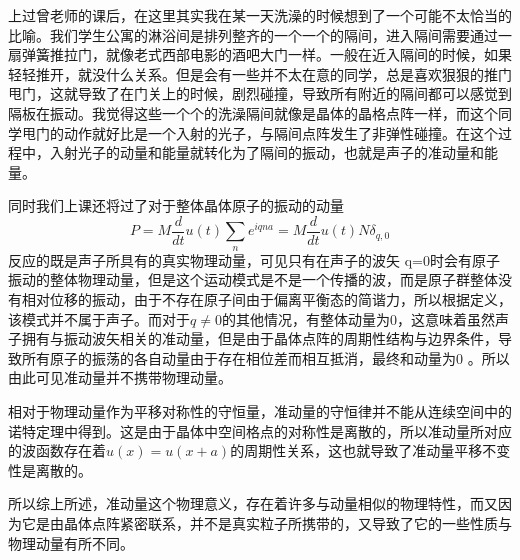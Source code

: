 \documentclass{article}
\begin{document}
上过曾老师的课后，在这里其实我在某一天洗澡的时候想到了一个可能不太恰当的比喻。我们学生公寓的淋浴间是排列整齐的一个一个的隔间，进入隔间需要通过一扇弹簧推拉门，就像老式西部电影的酒吧大门一样。一般在近入隔间的时候，如果轻轻推开，就没什么关系。但是会有一些并不太在意的同学，总是喜欢狠狠的推门甩门，这就导致了在门关上的时候，剧烈碰撞，导致所有附近的隔间都可以感觉到隔板在振动。我觉得这些一个个的洗澡隔间就像是晶体的晶格点阵一样，而这个同学甩门的动作就好比是一个入射的光子，与隔间点阵发生了非弹性碰撞。在这个过程中，入射光子的动量和能量就转化为了隔间的振动，也就是声子的准动量和能量。


同时我们上课还将过了对于整体晶体原子的振动的动量
\begin{equation}
	P=M\dfrac{d}{dt}u(t)\sum_{n}e^{iqna}=M\dfrac{d}{dt}u(t)N\delta_{q,0}
\end{equation}
反应的既是声子所具有的真实物理动量，可见只有在声子的波矢 q=0时会有原子振动的整体物理动量，但是这个运动模式是不是一个传播的波，而是原子群整体没有相对位移的振动，由于不存在原子间由于偏离平衡态的简谐力，所以根据定义，该模式并不属于声子。而对于$ q\neq0 $的其他情况，有整体动量为0，这意味着虽然声子拥有与振动波矢相关的准动量，但是由于晶体点阵的周期性结构与边界条件，导致所有原子的振荡的各自动量由于存在相位差而相互抵消，最终和动量为0 。所以由此可见准动量并不携带物理动量。


相对于物理动量作为平移对称性的守恒量，准动量的守恒律并不能从连续空间中的诺特定理中得到。这是由于晶体中空间格点的对称性是离散的，所以准动量所对应的波函数存在着$ u(x)=u(x+a) $的周期性关系，这也就导致了准动量平移不变性是离散的。


所以综上所述，准动量这个物理意义，存在着许多与动量相似的物理特性，而又因为它是由晶体点阵紧密联系，并不是真实粒子所携带的，又导致了它的一些性质与物理动量有所不同。
\end{document}
